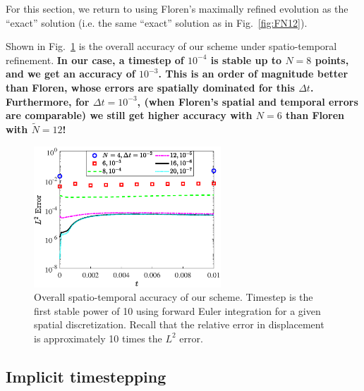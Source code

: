 For this section, we return to using Floren's maximally refined evolution as the ``exact'' solution (i.e. the same ``exact'' solution as in Fig.\ \ref{fig:FN12}). 

Shown in Fig.\ \ref{fig:UsEx} is the overall accuracy of our scheme under spatio-temporal refinement. \textbf{In our case, a timestep of $10^{-4}$ is stable up to $N=8$ points, and we get an accuracy of $10^{-3}$. This is an order of magnitude better than Floren, whose errors are spatially dominated for this $\Delta t$. Furthermore, for $\Delta t = 10^{-3}$, (when Floren's spatial and temporal errors are comparable) we still get higher accuracy with $N=6$ than Floren with $\tilde{N}=12$!}



\begin{figure}
\centering 
\includegraphics[width=70mm]{Local/UsTemporalSpatial.eps}
\caption{Overall spatio-temporal accuracy of our scheme. Timestep is the first stable power of 10 using forward Euler integration for a given spatial discretization. Recall that the relative error in displacement is approximately 10 times the $L^2$ error. } 
\label{fig:UsEx}
\end{figure}

\subsection{Implicit timestepping}

